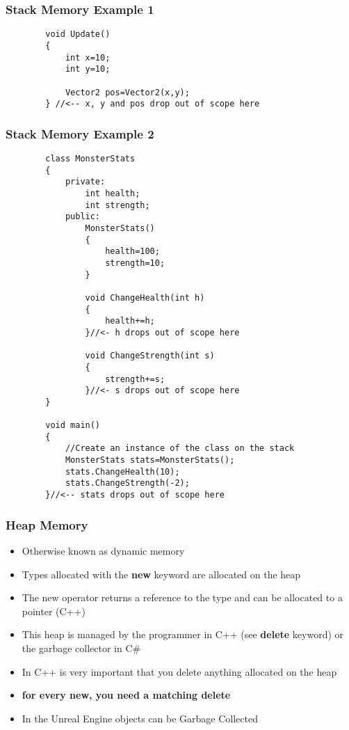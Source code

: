 \begin{frame}[fragile]
	\frametitle{Stack Memory Example 1}
	\begin{lstlisting}
		void Update()
		{
			int x=10;
			int y=10;
			
			Vector2 pos=Vector2(x,y);
		} //<-- x, y and pos drop out of scope here
	\end{lstlisting} 
\end{frame}

\begin{frame}[fragile]
	\frametitle{Stack Memory Example 2}
	\begin{lstlisting}
		class MonsterStats
		{
			private:
				int health;
				int strength;
			public:
				MonsterStats()
				{
					health=100;
					strength=10;
				}
			
				void ChangeHealth(int h)
				{
					health+=h;
				}//<- h drops out of scope here
			
				void ChangeStrength(int s)
				{
					strength+=s;
				}//<- s drops out of scope here
		}
		
		void main()
		{		
			//Create an instance of the class on the stack
			MonsterStats stats=MonsterStats();
			stats.ChangeHealth(10);
			stats.ChangeStrength(-2);
		}//<-- stats drops out of scope here
	\end{lstlisting}
\end{frame}

\begin{frame}
  \frametitle{Heap Memory}
  \begin{itemize}
  \item Otherwise known as dynamic memory
  \item Types allocated with the \textbf{new} keyword are allocated on the heap
  \item The new operator returns a reference to the type and can be allocated to a pointer (C++)
  \item This heap is managed by the programmer in C++ (see \textbf{delete} keyword) or the garbage collector in C\#
  \item In C++ is very important that you delete anything allocated on the heap
  \item \textbf{for every new, you need a matching delete}
  \item In the Unreal Engine objects can be Garbage Collected
  \end{itemize}
\end{frame}

